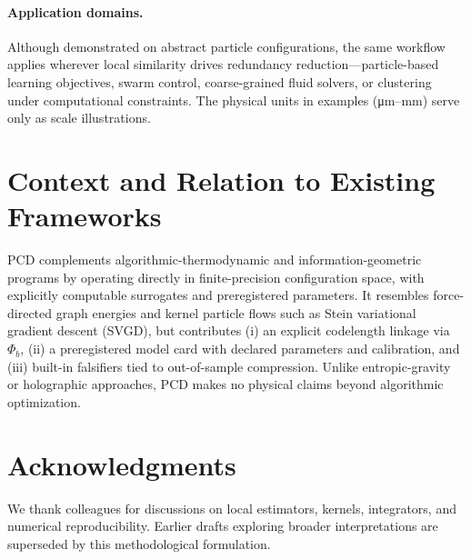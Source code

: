 \documentclass[11pt,a4paper]{article}
\numberwithin{equation}{section}
\begin{document}
\paragraph{Application domains.}
Although demonstrated on abstract particle configurations, the same workflow applies wherever local similarity drives redundancy reduction---particle-based learning objectives, swarm control, coarse-grained fluid solvers, or clustering under computational constraints. The physical units in examples (\si{\micro\meter}--\si{\milli\meter}) serve only as scale illustrations.

\section{Context and Relation to Existing Frameworks}
PCD complements algorithmic-thermodynamic and information-geometric programs by operating directly in finite-precision configuration space, with explicitly computable surrogates and preregistered parameters. It resembles force-directed graph energies and kernel particle flows such as Stein variational gradient descent (SVGD), but contributes (i) an explicit codelength linkage via $\Phi_b$, (ii) a preregistered model card with declared parameters and calibration, and (iii) built-in falsifiers tied to out-of-sample compression. Unlike entropic-gravity or holographic approaches, PCD makes no physical claims beyond algorithmic optimization.

\section*{Acknowledgments}
We thank colleagues for discussions on local estimators, kernels, integrators, and numerical reproducibility. Earlier drafts exploring broader interpretations are superseded by this methodological formulation.
\end{document}
